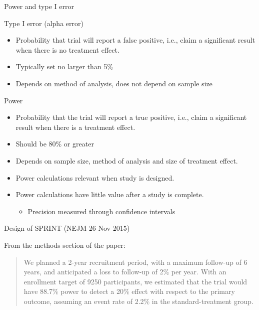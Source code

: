 \documentclass[ignorenonframetext,]{beamer}
\providecommand{\tightlist}{%
\setlength{\itemsep}{0pt}\setlength{\parskip}{0pt}}
\begin{document}
\begin{frame}{Power and type I error}

Type I error (alpha error)

\begin{itemize}
\item
  Probability that trial will report a false positive, i.e., claim a
  significant result when there is no treatment effect.
\item
  Typically set no larger than 5\%
\item
  Depends on method of analysis, does not depend on sample size
\end{itemize}

Power

\begin{itemize}
\item
  Probability that the trial will report a true positive, i.e., claim a
  significant result when there is a treatment effect.
\item
  Should be 80\% or greater
\item
  Depends on sample size, method of analysis and size of treatment
  effect.
\item
  Power calculations relevant when study is designed.
\item
  Power calculations have little value after a study is complete.

  \begin{itemize}
  \tightlist
  \item
    Precision measured through confidence intervals
  \end{itemize}
\end{itemize}

\end{frame}

\begin{frame}{Design of SPRINT (NEJM 26 Nov 2015)}

From the methods section of the paper:

\begin{quote}
We planned a 2-year recruitment period, with a maximum follow-up of 6 years, and anticipated a loss to follow-up of 2\% per year. With an enrollment target of 9250 participants, we estimated  that the trial would have 88.7\% power to detect  a 20\% effect with respect to the primary outcome, assuming an event rate of 2.2\% in the standard-treatment group.
\end{quote}

\end{frame}
\end{document}

